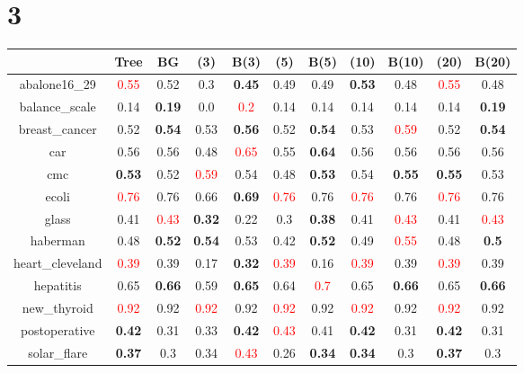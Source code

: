 \documentclass{article}%
\begin{document}
\section*{3}%
\begin{tabular}{c|cccccccccc}%
\hline%
&Tree&BG&(3)&B(3)&(5)&B(5)&(10)&B(10)&(20)&B(20)\\%
\hline%
abalone16\_29&\textcolor{red}{ 
0.55
}&0.52&0.3&\textbf{0.45}&0.49&0.49&\textbf{0.53}&0.48&\textcolor{red}{ 
0.55
}&0.48\\%
\hline%
balance\_scale&0.14&\textbf{0.19}&0.0&\textcolor{red}{ 
0.2
}&0.14&0.14&0.14&0.14&0.14&\textbf{0.19}\\%
\hline%
breast\_cancer&0.52&\textbf{0.54}&0.53&\textbf{0.56}&0.52&\textbf{0.54}&0.53&\textcolor{red}{ 
0.59
}&0.52&\textbf{0.54}\\%
\hline%
car&0.56&0.56&0.48&\textcolor{red}{ 
0.65
}&0.55&\textbf{0.64}&0.56&0.56&0.56&0.56\\%
\hline%
cmc&\textbf{0.53}&0.52&\textcolor{red}{ 
0.59
}&0.54&0.48&\textbf{0.53}&0.54&\textbf{0.55}&\textbf{0.55}&0.53\\%
\hline%
ecoli&\textcolor{red}{ 
0.76
}&0.76&0.66&\textbf{0.69}&\textcolor{red}{ 
0.76
}&0.76&\textcolor{red}{ 
0.76
}&0.76&\textcolor{red}{ 
0.76
}&0.76\\%
\hline%
glass&0.41&\textcolor{red}{ 
0.43
}&\textbf{0.32}&0.22&0.3&\textbf{0.38}&0.41&\textcolor{red}{ 
0.43
}&0.41&\textcolor{red}{ 
0.43
}\\%
\hline%
haberman&0.48&\textbf{0.52}&\textbf{0.54}&0.53&0.42&\textbf{0.52}&0.49&\textcolor{red}{ 
0.55
}&0.48&\textbf{0.5}\\%
\hline%
heart\_cleveland&\textcolor{red}{ 
0.39
}&0.39&0.17&\textbf{0.32}&\textcolor{red}{ 
0.39
}&0.16&\textcolor{red}{ 
0.39
}&0.39&\textcolor{red}{ 
0.39
}&0.39\\%
\hline%
hepatitis&0.65&\textbf{0.66}&0.59&\textbf{0.65}&0.64&\textcolor{red}{ 
0.7
}&0.65&\textbf{0.66}&0.65&\textbf{0.66}\\%
\hline%
new\_thyroid&\textcolor{red}{ 
0.92
}&0.92&\textcolor{red}{ 
0.92
}&0.92&\textcolor{red}{ 
0.92
}&0.92&\textcolor{red}{ 
0.92
}&0.92&\textcolor{red}{ 
0.92
}&0.92\\%
\hline%
postoperative&\textbf{0.42}&0.31&0.33&\textbf{0.42}&\textcolor{red}{ 
0.43
}&0.41&\textbf{0.42}&0.31&\textbf{0.42}&0.31\\%
\hline%
solar\_flare&\textbf{0.37}&0.3&0.34&\textcolor{red}{ 
0.43
}&0.26&\textbf{0.34}&\textbf{0.34}&0.3&\textbf{0.37}&0.3\\%

\end{tabular}
\end{document}

